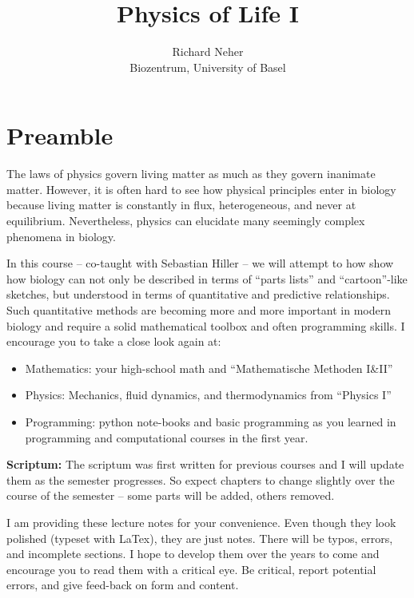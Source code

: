 \documentclass[a4]{book}
\author{Richard Neher\\Biozentrum, University of Basel}
\title{Physics of Life I}
\begin{document}
\maketitle

\chapter*{Preamble}

The laws of physics govern living matter as much as they govern inanimate matter.
However, it is often hard to see how physical principles enter in biology because living matter is constantly in flux, heterogeneous, and never at equilibrium.
Nevertheless, physics can elucidate many seemingly complex phenomena in biology.

In this course -- co-taught with Sebastian Hiller -- we will attempt to how show how biology can not only be described in terms of ``parts lists'' and ``cartoon''-like sketches, but understood in terms of quantitative and predictive relationships.
Such quantitative methods are becoming more and more important in modern biology and require a solid mathematical toolbox and often programming skills.
I encourage you to take a close look again at:
\begin{itemize}
	\item Mathematics: your high-school math and ``Mathematische Methoden I\&II''
	\item Physics: Mechanics, fluid dynamics, and thermodynamics from ``Physics I''
	\item Programming: python note-books and basic programming as you learned in programming and computational courses in the first year.
\end{itemize}

{\bf Scriptum:}
The scriptum was first written for previous courses and I will update them as the semester progresses.
So expect chapters to change slightly over the course of the semester -- some parts will be added, others removed.

I am providing these lecture notes for your convenience.
Even though they look polished (typeset with LaTex), they are just notes.
There will be typos, errors, and incomplete sections.
I hope to develop them over the years to come and encourage you to read them with a critical eye.
Be critical, report potential errors, and give feed-back on form and content.
\end{document}
